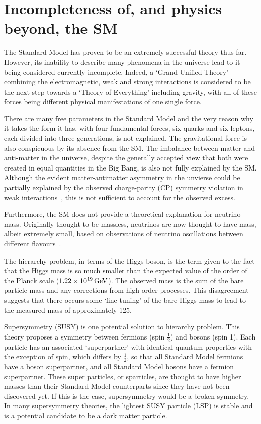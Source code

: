 \section{Incompleteness of, and physics beyond, the SM}
\label{s:Incompleteness_of_and_physics_beyond_the_SM}
The Standard Model has proven to be an extremely successful theory thus far. However, its inability to
describe many phenomena in the universe lead to it being considered currently incomplete. Indeed, a `Grand
Unified Theory' combining the electromagnetic, weak and strong interactions is considered to be the next step
towards a `Theory of Everything' including gravity, with all of these forces being different physical
manifestations of one single force.

There are many free parameters in the Standard Model and the very reason why it takes the form it has, with
four fundamental forces, six quarks and six leptons, each divided into three generations, is not explained.
The gravitational force is also conspicuous by its absence from the SM. The imbalance between matter and
anti-matter in the universe, despite the generally accepted view that both were created in equal quantities in
the Big Bang, is also not fully explained by the SM. Although the evident matter-antimatter asymmetry in the
unvierse could be partially explained by the observed charge-parity (CP) symmetry violation in weak
interactions~\cite{Christenson:1964fg}, this is not sufficient to account for the observed excess.

Furthermore, the SM does not provide a theoretical explanation for neutrino mass. Originally thought to be
massless, neutrinos are now thought to have mass, albeit extremely small, based on observations of neutrino
oscillations between different flavours~\cite{Kajita:1998bw,Fukuda:1998mi}.

The hierarchy problem, in terms of the Higgs boson, is the term given to the fact that the Higgs mass is so
much smaller than the expected value of the order of the Planck scale ($1.22\times10^{19}\,\text{Ge\hspace{-.08em}V}$). The observed
mass is the sum of the bare particle mass and any corrections from high order processes. This disagreement
suggests that there occurs some `fine tuning' of the bare Higgs mass to lead to the measured mass of
approximately 125\GeV.

Supersymmetry (SUSY) is one potential solution to hierarchy problem. This theory proposes a symmetry
between fermions (spin $\frac{1}{2}$) and bosons (spin 1). Each particle has an associated `superpartner' with
identical quantum properties with the exception of spin, which differs by $\frac{1}{2}$, so that all
Standard Model fermions have a boson superpartner, and all Standard Model bosons have a fermion superpartner.
These super particles, or sparticles, are thought to have higher masses than their Standard Model counterparts
since they have not been discovered yet. If this is the case, supersymmetry would be a broken symmetry. In
many supersymmetry theories, the lightest SUSY particle (LSP) is stable and is a potential candidate to be
a dark matter particle.

